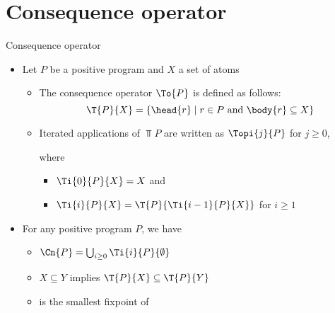 \section{Consequence operator}
\begin{frame}{Consequence operator}

  \begin{itemize}
  \item Let $P$ be a positive program and $X$ a set of atoms

    \begin{itemize}
    \item<1->
      The \alert{consequence operator} $\To{P}$ is defined as follows:
      \[
      \T{P}{X} = \{  \head{r}\mid r\in P\text{ and }\body{r}\subseteq X  \}
      \]
    \item<2->
      Iterated applications of $\Top{P}$ are written as $\Topi{j}{P}$ for
      $j\geq 0$,

      where
      \begin{itemize}
      \item \small
        \(
        \Ti{0}{P}{X}=X
        \)
        and
        \smallskip
      \item \small
        \(
        \Ti{i}{P}{X}=\T{P}{\Ti{i-1}{P}{X}}
        \)
        for $i\geq 1$
      \end{itemize}
    \end{itemize}
    \medskip
  \item<3-> For any positive program $P$, we have
    \begin{itemize}\itemsep .5ex
    \item $\Cn{P}=\bigcup_{i\geq 0}\Ti{i}{P}{\emptyset}$
    \item $X\subseteq Y$ implies $\T{P}{X}\subseteq\T{P}{Y}$
    \item {} is the smallest fixpoint of 
    \end{itemize}
  \end{itemize}

\end{frame}
